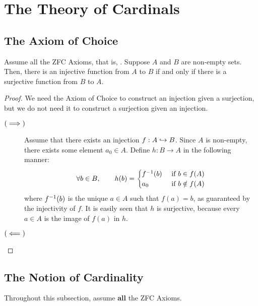 \section{The Theory of Cardinals}

\subsection{The Axiom of Choice}

\sorry

\begin{boxlemma}
    Assume all the ZFC Axioms, that is, \sorry. Suppose $A$ and $B$ are non-empty sets. Then, there is an injective function from $A$ to $B$ if and only if there is a surjective function from $B$ to $A$.
\end{boxlemma}
\begin{proof}
    We need the Axiom of Choice to construct an injection given a surjection, but we do not need it to construct a surjection given an injection.

    \begin{description}
        \item[$\left( \implies \right)$]
        Assume that there exists an injection $f : A \hookrightarrow B$. Since $A$ is non-empty, there exists some element $a_0 \in A$. Define $h : B \to A$ in the following manner:
        \begin{align*}
            \forall b \in B, \qquad
            h(b) =
            \begin{cases}
                f^{-1}(b) &\text{ if } b \in f(A) \\
                a_0 &\text{ if } b \notin f(A)
            \end{cases}
        \end{align*}
        where $f^{-1}(b)$ is the unique $a \in A$ such that $f(a) = b$, as guaranteed by the injectivity of $f$. It is easily seen that $h$ is surjective, because every $a \in A$ is the image of $f(a)$ in $h$.

        \item[$\left( \impliedby \right)$] \sorry
    \end{description}
\end{proof}

\subsection{The Notion of Cardinality}

Throughout this subsection, assume \textbf{all} the ZFC Axioms.

